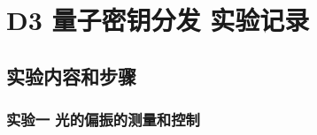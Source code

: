 \documentclass[dvipsnames, svgnames,a4paper,11pt]{article}
\begin{document}
\section{D3 \quad 量子密钥分发 \quad\heiti 实验记录}

\subsection{实验内容和步骤}

	\subsubsection{实验一 \quad 光的偏振的测量和控制}

	
\end{document}
